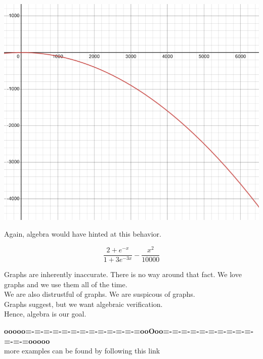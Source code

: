 \documentclass{ximera}
\begin{document}
\begin{example}
\begin{image}
\includegraphics{pics/graph_4B.png}
\end{image}





Again, algebra would have hinted at this behavior.

\[  \frac{2+e^{-x}}{1+3 e^{-3x}} -\frac{x^2}{10000}     \]


\end{example}



Graphs are inherently inaccurate.  There is no way around that fact.  We love graphs and we use them all of the time. \\

We are also distrustful of graphs.  We are suspicous of graphs. \\

Graphs suggest, but we want algebraic verification. \\

Hence, algebra is our goal.














\begin{center}
\textbf{\textcolor{green!50!black}{ooooo=-=-=-=-=-=-=-=-=-=-=-=-=ooOoo=-=-=-=-=-=-=-=-=-=-=-=-=ooooo}} \\

more examples can be found by following this link\\ 

\end{center}
\end{document}
